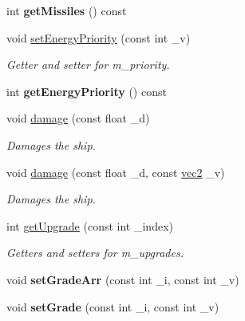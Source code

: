 \begin{DoxyCompactItemize}
\item 
\hypertarget{classship_ac2a1cdc999b5c9d1528d39485aa980de}{int {\bfseries get\-Missiles} () const }\label{classship_ac2a1cdc999b5c9d1528d39485aa980de}

\item 
\hypertarget{classship_ac48ed042184a82f48389d0d7f9d3cbef}{void \hyperlink{classship_ac48ed042184a82f48389d0d7f9d3cbef}{set\-Energy\-Priority} (const int \-\_\-v)}\label{classship_ac48ed042184a82f48389d0d7f9d3cbef}

\begin{DoxyCompactList}\small\item\em Getter and setter for m\-\_\-priority. \end{DoxyCompactList}\item 
\hypertarget{classship_a7350a3e1ccf4042f84b3c1c9630835a4}{int {\bfseries get\-Energy\-Priority} () const }\label{classship_a7350a3e1ccf4042f84b3c1c9630835a4}

\item 
void \hyperlink{classship_aa6750a5206440d777ac933e282f6479f}{damage} (const float \-\_\-d)
\begin{DoxyCompactList}\small\item\em Damages the ship. \end{DoxyCompactList}\item 
void \hyperlink{classship_ae365ae5221a1bee3b46f76e00e3aba31}{damage} (const float \-\_\-d, const \hyperlink{structvec2}{vec2} \-\_\-v)
\begin{DoxyCompactList}\small\item\em Damages the ship. \end{DoxyCompactList}\item 
\hypertarget{classship_a487b3030a123fb11d5173b039621cf30}{int \hyperlink{classship_a487b3030a123fb11d5173b039621cf30}{get\-Upgrade} (const int \-\_\-index)}\label{classship_a487b3030a123fb11d5173b039621cf30}

\begin{DoxyCompactList}\small\item\em Getters and setters for m\-\_\-upgrades. \end{DoxyCompactList}\item 
\hypertarget{classship_a2f0eebc8a3a9908bfbdea941a24798fa}{void {\bfseries set\-Grade\-Arr} (const int \-\_\-i, const int \-\_\-v)}\label{classship_a2f0eebc8a3a9908bfbdea941a24798fa}

\item 
\hypertarget{classship_a9304f314a13a2a81f73472d9530d0efb}{void {\bfseries set\-Grade} (const int \-\_\-i, const int \-\_\-v)}\label{classship_a9304f314a13a2a81f73472d9530d0efb}


\end{DoxyCompactItemize}
